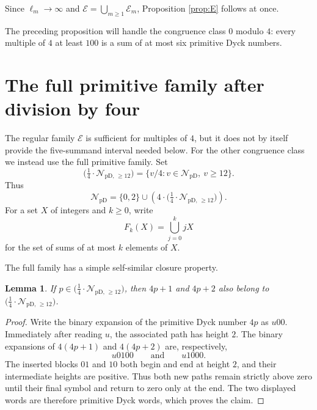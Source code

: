 \documentclass[12pt]{article}
\theoremstyle{plain}
\newtheorem{lemma}[theorem]{Lemma}
\newcommand{\NpD}{\mathcal{N}_{\mathrm{pD}}}
\newcommand{\Pset}{\bigl(\tfrac14\cdot
  \mathcal N_{\mathrm{pD,\,\geq12}}\bigr)}
\begin{document}
Since $\ell_{m}\to\infty$ and $\mathcal E=\bigcup_{m\geq1}\mathcal E_{m}$,
Proposition \ref{prop:E} follows at once.

The preceding proposition will handle the congruence class $0$ modulo
$4$: every multiple of $4$ at least $100$ is a sum of at most six
primitive Dyck numbers.

\section{The full primitive family after division by four}

The regular family $\mathcal E$ is sufficient for multiples of $4$, but
it does not by itself provide the five-summand interval needed below.
For the other congruence class we instead use the full primitive family.
Set
\[
 \Pset=\{v/4:v\in\NpD,\ v\geq12\}.
\]
Thus
\[
 \NpD=\{0,2\}\cup(4\cdot\Pset).
\]
For a set $X$ of integers and $k\geq0$, write
\[
 F_k(X)=\bigcup_{j=0}^{k}jX
\]
for the set of sums of at most $k$ elements of $X$.

The full family has a simple self-similar closure property.

\begin{lemma}\label{lem:Pclosure}
If $p\in\Pset$, then $4p+1$ and $4p+2$ also belong to $\Pset$.
\end{lemma}

\begin{proof}
Write the binary expansion of the primitive Dyck number $4p$ as $u00$.
Immediately after reading $u$, the associated path has height $2$.  The
binary expansions of $4(4p+1)$ and $4(4p+2)$ are, respectively,
\[
 u0100\qquad\text{and}\qquad u1000.
\]
The inserted blocks $01$ and $10$ both begin and end at height $2$, and
their intermediate heights are positive.  Thus both new paths remain
strictly above zero until their final symbol and return to zero only at
the end.  The two displayed words are therefore primitive Dyck words,
which proves the claim.
\end{proof}
\end{document}
